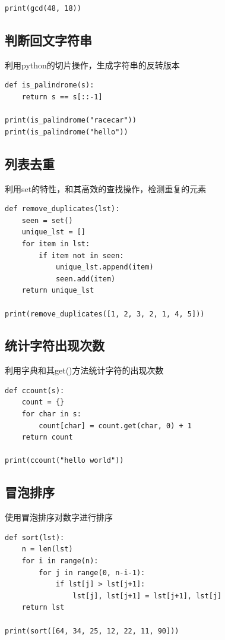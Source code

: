\documentclass[UTF8,a4paper]{ctexart}
\begin{document}
\begin{sloppypar}
\begin{lstlisting}
print(gcd(48, 18)) 
\end{lstlisting}


\subsection{判断回文字符串}
	利用python的切片操作，生成字符串的反转版本
\begin{lstlisting}
def is_palindrome(s):
    return s == s[::-1]

print(is_palindrome("racecar")) 
print(is_palindrome("hello"))

\end{lstlisting}

	
\subsection{列表去重}
	利用set的特性，和其高效的查找操作，检测重复的元素
\begin{lstlisting}
def remove_duplicates(lst):
    seen = set()
    unique_lst = []
    for item in lst:
        if item not in seen:
            unique_lst.append(item)
            seen.add(item)
    return unique_lst

print(remove_duplicates([1, 2, 3, 2, 1, 4, 5]))  

\end{lstlisting}

\subsection{统计字符出现次数}
	利用字典和其get()方法统计字符的出现次数
\begin{lstlisting}
def ccount(s):
    count = {}
    for char in s:
        count[char] = count.get(char, 0) + 1
    return count

print(ccount("hello world")) 

\end{lstlisting}

\subsection{冒泡排序}
	使用冒泡排序对数字进行排序
\begin{lstlisting}
def sort(lst):
    n = len(lst)
    for i in range(n):
        for j in range(0, n-i-1):
            if lst[j] > lst[j+1]:
                lst[j], lst[j+1] = lst[j+1], lst[j]
    return lst

print(sort([64, 34, 25, 12, 22, 11, 90]))
\end{lstlisting}


\end{sloppypar}
\end{document}
